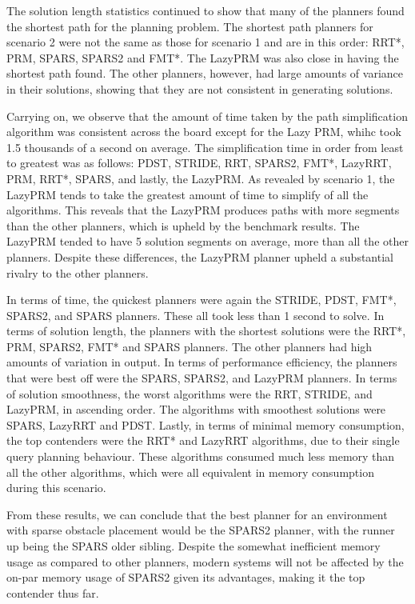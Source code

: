 \documentclass[conference]{IEEEtran} \usepackage[T1]{fontenc} \usepackage[backend=biber, style=ieee]{biblatex}
\begin{document}
The solution length statistics continued to show that many of the planners found the shortest path for the planning problem. The shortest path planners for scenario 2 were not the 
same as those for scenario 1 and are in this order: RRT*, PRM, SPARS, SPARS2 and FMT*. The LazyPRM was also close in having the shortest path found. The other planners, however,
had large amounts of variance in their solutions, showing that they are not consistent in generating solutions.

Carrying on, we observe that the amount of time taken by the path simplification algorithm was consistent across the board except for the Lazy PRM, whihc took 1.5 thousands of a
second on average. The simplification time in order from least to greatest was as follows: PDST, STRIDE, RRT, SPARS2, FMT*, LazyRRT, PRM, RRT*, SPARS, and lastly, the LazyPRM. As
revealed by scenario 1, the LazyPRM tends to take the greatest amount of time to simplify of all the algorithms. This reveals that the LazyPRM produces paths with more segments
than the other planners, which is upheld by the benchmark results. The LazyPRM tended to have 5 solution segments on average, more than all the other planners. Despite these
differences, the LazyPRM planner upheld a substantial rivalry to the other planners.

In terms of time, the quickest planners were again the STRIDE, PDST, FMT*, SPARS2, and SPARS planners. These all took less than 1 second to solve.
In terms of solution length, the planners with the shortest solutions were the RRT*, PRM, SPARS2, FMT* and SPARS planners. The other planners had high amounts of variation in 
output. In terms of performance efficiency, the planners that were best off were the SPARS, SPARS2, and LazyPRM planners. In terms of solution smoothness, the worst algorithms
were the RRT, STRIDE, and LazyPRM, in ascending order. The algorithms with smoothest solutions were SPARS, LazyRRT and PDST. Lastly, in terms of minimal memory consumption, the top 
contenders were the RRT* and LazyRRT algorithms, due to their single query planning behaviour. These algorithms consumed much less memory than all the other algorithms, which
were all equivalent in memory consumption during this scenario.

From these results, we can conclude that the best planner for an environment with sparse obstacle placement would be the SPARS2 planner, with the runner up being the
SPARS older sibling. Despite the somewhat inefficient memory usage as compared to other planners, modern systems will not be affected by the on-par memory usage of SPARS2 given its 
advantages, making it the top contender thus far.
\end{document}
